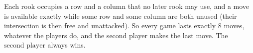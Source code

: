 Each rook occupies a row and a column that no later rook may use, and a move is available exactly while some row and some column are both unused (their intersection is then free and unattacked). So every game lasts exactly $8$ moves, whatever the players do, and the second player makes the last move. The $\boxed{\text{second player}}$ always wins.
